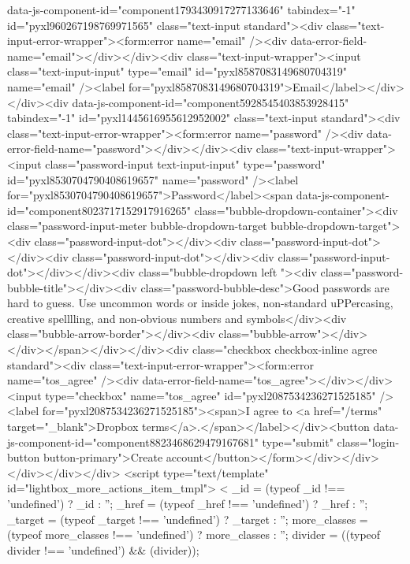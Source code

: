 {data-js-component-id="component1793430917277133646" tabindex="-1" id="pyxl960267198769971565" class="text-input  standard"><div class="text-input-error-wrapper"><form:error name="email" /><div data-error-field-name="email"></div></div><div class="text-input-wrapper"><input class="text-input-input" type="email" id="pyxl8587083149680704319" name="email" /><label for="pyxl8587083149680704319">Email</label></div></div><div data-js-component-id="component5928545403853928415" tabindex="-1" id="pyxl1445616955612952002" class="text-input  standard"><div class="text-input-error-wrapper"><form:error name="password" /><div data-error-field-name="password"></div></div><div class="text-input-wrapper"><input class="password-input text-input-input" type="password" id="pyxl8530704790408619657" name="password" /><label for="pyxl8530704790408619657">Password</label><span data-js-component-id="component8023717152917916265" class="bubble-dropdown-container"><div class="password-input-meter bubble-dropdown-target bubble-dropdown-target"><div class="password-input-dot"></div><div class="password-input-dot"></div><div class="password-input-dot"></div><div class="password-input-dot"></div></div><div class="bubble-dropdown left "><div class="password-bubble-title"></div><div class="password-bubble-desc">Good passwords are hard to guess. Use uncommon words or inside jokes, non-standard uPPercasing, creative spelllling, and non-obvious numbers and symbols</div><div class="bubble-arrow-border"></div><div class="bubble-arrow"></div></div></span></div></div><div class="checkbox checkbox-inline agree standard"><div class="text-input-error-wrapper"><form:error name="tos_agree" /><div data-error-field-name="tos_agree"></div></div><input type="checkbox" name="tos_agree" id="pyxl2087534236271525185" /><label for="pyxl2087534236271525185"><span>I agree to <a href="/terms" target="_blank">Dropbox terms</a>.</span></label></div><button data-js-component-id="component8823468629479167681" type="submit" class="login-button button-primary">Create account</button></form></div></div></div></div></div>
<script type="text/template" id="lightbox_more_actions_item_tmpl">
<%
  _id = (typeof _id !== 'undefined') ? _id : '';
  _href = (typeof _href !== 'undefined') ? _href : '';
  _target = (typeof _target !== 'undefined') ? _target : '';
  more_classes = (typeof more_classes !== 'undefined') ? more_classes : '';
  divider = ((typeof divider !== 'undefined') && (divider));

}
